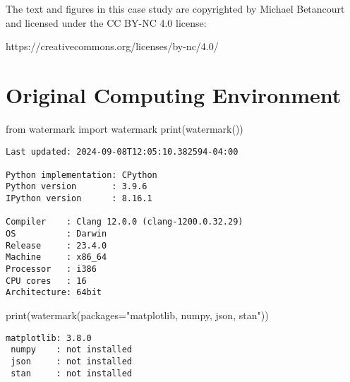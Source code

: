 \documentclass[
  letterpaper,
  DIV=11,
  numbers=noendperiod]{scrartcl}
\newenvironment{Shaded}{\begin{snugshade}}{\end{snugshade}}
\newcommand{\BuiltInTok}[1]{\textcolor[rgb]{0.00,0.23,0.31}{#1}}
\newcommand{\ImportTok}[1]{\textcolor[rgb]{0.00,0.46,0.62}{#1}}
\newcommand{\NormalTok}[1]{\textcolor[rgb]{0.00,0.23,0.31}{#1}}
\newcommand{\OperatorTok}[1]{\textcolor[rgb]{0.37,0.37,0.37}{#1}}
\newcommand{\StringTok}[1]{\textcolor[rgb]{0.13,0.47,0.30}{#1}}
\begin{document}
The text and figures in this case study are copyrighted by Michael
Betancourt and licensed under the CC BY-NC 4.0 license:

https://creativecommons.org/licenses/by-nc/4.0/

\section*{Original Computing
Environment}\label{original-computing-environment}

\begin{Shaded}
\begin{Highlighting}[]
\ImportTok{from}\NormalTok{ watermark }\ImportTok{import}\NormalTok{ watermark}
\BuiltInTok{print}\NormalTok{(watermark())}
\end{Highlighting}
\end{Shaded}

\begin{verbatim}
Last updated: 2024-09-08T12:05:10.382594-04:00

Python implementation: CPython
Python version       : 3.9.6
IPython version      : 8.16.1

Compiler    : Clang 12.0.0 (clang-1200.0.32.29)
OS          : Darwin
Release     : 23.4.0
Machine     : x86_64
Processor   : i386
CPU cores   : 16
Architecture: 64bit
\end{verbatim}

\begin{Shaded}
\begin{Highlighting}[]
\BuiltInTok{print}\NormalTok{(watermark(packages}\OperatorTok{=}\StringTok{"matplotlib, numpy, json, stan"}\NormalTok{))}
\end{Highlighting}
\end{Shaded}

\begin{verbatim}
matplotlib: 3.8.0
 numpy    : not installed
 json     : not installed
 stan     : not installed
\end{verbatim}
\end{document}
